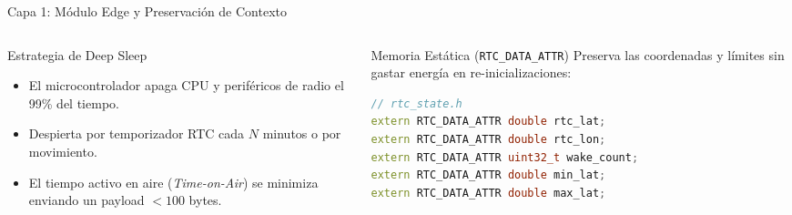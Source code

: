 \documentclass[aspectratio=43]{beamer}
\begin{document}
\begin{frame}[fragile]{Capa 1: Módulo Edge y Preservación de Contexto}
    \begin{columns}[T]
        \begin{column}{0.48\textwidth}
            \begin{block}{Estrategia de Deep Sleep}
                \scriptsize
                \begin{itemize}
                    \item El microcontrolador apaga CPU y periféricos de radio el 99\% del tiempo.
                    \item Despierta por temporizador RTC cada $N$ minutos o por movimiento.
                    \item El tiempo activo en aire (\textit{Time-on-Air}) se minimiza enviando un payload $<100$ bytes.
                \end{itemize}
            \end{block}
        \end{column}
        \begin{column}{0.48\textwidth}
            \begin{block}{Memoria Estática (\texttt{RTC\_DATA\_ATTR})}
                \scriptsize
                Preserva las coordenadas y límites sin gastar energía en re-inicializaciones:
            \end{block}
            \begin{lstlisting}[language=C++]
// rtc_state.h
extern RTC_DATA_ATTR double rtc_lat;
extern RTC_DATA_ATTR double rtc_lon;
extern RTC_DATA_ATTR uint32_t wake_count;
extern RTC_DATA_ATTR double min_lat;
extern RTC_DATA_ATTR double max_lat;
            \end{lstlisting}
        \end{column}
    \end{columns}
\end{frame}
\end{document}
